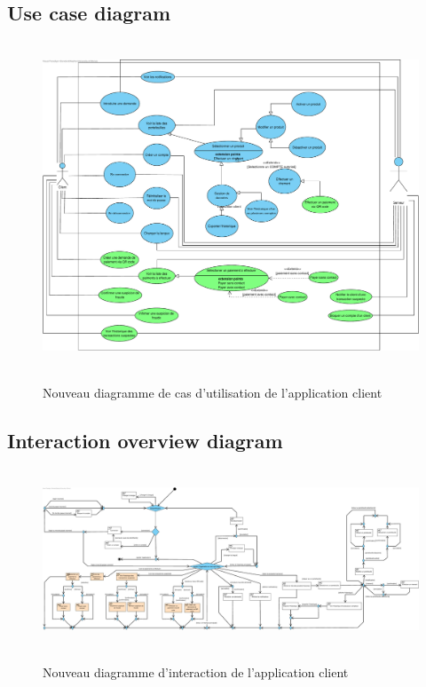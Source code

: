 \documentclass[]{report}
\begin{document}
\subsection{Use case diagram}

\begin{figure}[h!]
\vspace{2cm}
\hspace{-1cm}
\hbox{
	\includegraphics[scale=0.45]{img/Use Case Client - Extension 6.pdf}
}
\caption{Nouveau diagramme de cas d'utilisation de l'application client}
\end{figure}



\newpage

\subsection{Interaction overview diagram}



\begin{figure}[h!]
\hspace{-3cm}
\hbox{
	\includegraphics[scale=0.5]{img/Interaction Overview Client - Extension 6.pdf}
}
\caption{Nouveau diagramme d'interaction de l'application client}
\end{figure}
\end{document}
